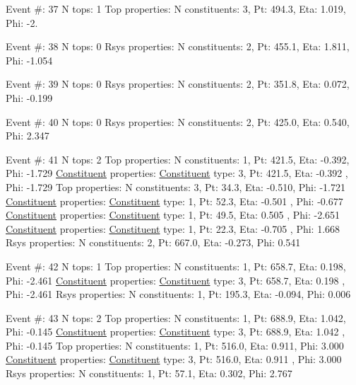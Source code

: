 \begin{DoxyCode}
Event #: 37
      N tops: 1
      Top properties: N constituents:   3,   Pt:  494.3,   Eta:   1.019,   Phi:  -2.

Event #: 38
      N tops: 0
      Rsys properties: N constituents:   2,   Pt:  455.1,   Eta:   1.811,   Phi:  -1.054

Event #: 39
      N tops: 0
      Rsys properties: N constituents:   2,   Pt:  351.8,   Eta:   0.072,   Phi:  -0.199

Event #: 40
      N tops: 0
      Rsys properties: N constituents:   2,   Pt:  425.0,   Eta:   0.540,   Phi:   2.347

Event #: 41
      N tops: 2
      Top properties: N constituents:   1,   Pt:  421.5,   Eta:  -0.392,   Phi:  -1.729
          \hyperlink{classConstituent}{Constituent} properties: \hyperlink{classConstituent}{Constituent} type:   3,   Pt:  421.5,   Eta:  -0.392
      ,   Phi:  -1.729
      Top properties: N constituents:   3,   Pt:   34.3,   Eta:  -0.510,   Phi:  -1.721
          \hyperlink{classConstituent}{Constituent} properties: \hyperlink{classConstituent}{Constituent} type:   1,   Pt:   52.3,   Eta:  -0.501
      ,   Phi:  -0.677
          \hyperlink{classConstituent}{Constituent} properties: \hyperlink{classConstituent}{Constituent} type:   1,   Pt:   49.5,   Eta:   0.505
      ,   Phi:  -2.651
          \hyperlink{classConstituent}{Constituent} properties: \hyperlink{classConstituent}{Constituent} type:   1,   Pt:   22.3,   Eta:  -0.705
      ,   Phi:   1.668
      Rsys properties: N constituents:   2,   Pt:  667.0,   Eta:  -0.273,   Phi:   0.541

Event #: 42
      N tops: 1
      Top properties: N constituents:   1,   Pt:  658.7,   Eta:   0.198,   Phi:  -2.461
          \hyperlink{classConstituent}{Constituent} properties: \hyperlink{classConstituent}{Constituent} type:   3,   Pt:  658.7,   Eta:   0.198
      ,   Phi:  -2.461
      Rsys properties: N constituents:   1,   Pt:  195.3,   Eta:  -0.094,   Phi:   0.006

Event #: 43
      N tops: 2
      Top properties: N constituents:   1,   Pt:  688.9,   Eta:   1.042,   Phi:  -0.145
          \hyperlink{classConstituent}{Constituent} properties: \hyperlink{classConstituent}{Constituent} type:   3,   Pt:  688.9,   Eta:   1.042
      ,   Phi:  -0.145
      Top properties: N constituents:   1,   Pt:  516.0,   Eta:   0.911,   Phi:   3.000
          \hyperlink{classConstituent}{Constituent} properties: \hyperlink{classConstituent}{Constituent} type:   3,   Pt:  516.0,   Eta:   0.911
      ,   Phi:   3.000
      Rsys properties: N constituents:   1,   Pt:   57.1,   Eta:   0.302,   Phi:   2.767


\end{DoxyCode}
